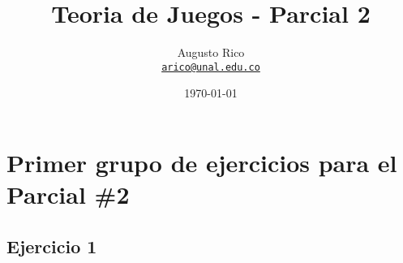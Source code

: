 \documentclass[11pt]{article}
\title{Teoria de Juegos - Parcial 2}
\author{Augusto Rico\\
    \href{mailto:arico@unal.edu.co}{\texttt{arico@unal.edu.co}}}
\date{\today}
\begin{document}
\maketitle



\section{Primer grupo de ejercicios para el Parcial \#2}

\subsection{Ejercicio 1}
\end{document}
